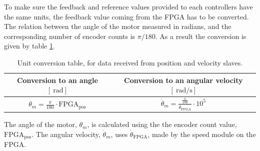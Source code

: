 \documentclass[../../main.tex]{subfiles}
\begin{document}
To make sure the feedback and reference values provided to each controllers have the same units, the feedback value coming from the FPGA has to be converted. The relation between the angle of the motor measured in radians, and the corresponding number of encoder counts is $\pi / 180$. As a result the conversion is given by table \ref{tab:conversionposvel}.

\begin{table}[H]
\centering
\begin{tabular}{c|c}
Conversion to an angle $\left[\SI{}{\radian}\right]$ & Conversion to an angular velocity $\left [ \SI{}{\radian \per \second }\right ]$ \\ \hline
 $\theta_{m} = \frac{\pi}{180} \cdot \mathrm{FPGA_{pos}}$ & $\dot{\theta}_{m} = \frac{\frac{\pi}{180}}{ \dot{\theta}_{\mathrm{FPGA}} }\cdot 10^{5}$ 
\end{tabular}
\caption{Unit conversion table, for data received from position and velocity slaves.}
\label{tab:conversionposvel}
\end{table}
The angle of the motor, $\theta_m$, is calculated using the the encoder count value, $\mathrm{FPGA_{pos}}$. The angular velocity, $\dot{\theta}_m$, uses $\dot{\theta}_{\mathrm{FPGA}}$, made by the speed module on the FPGA.








\end{document}
